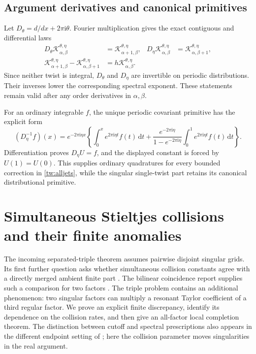 \documentclass[11pt,a4paper]{article}
\numberwithin{equation}{section}
\theoremstyle{definition}
\theoremstyle{remark}
\newcommand{\ii}{\mathrm i}
\newcommand{\dd}{\,\mathrm d}
\begin{document}
\subsection{Argument derivatives and canonical primitives}

Let $D_\theta=d/dx+2\pi\ii\theta$. Fourier multiplication gives
the exact contiguous and differential laws
\begin{align}
 D_\theta\mathcal K_{\alpha,\beta}^{\theta,\eta}
   &=\mathcal K_{\alpha+1,\beta}^{\theta,\eta},&
 D_\eta\mathcal K_{\alpha,\beta}^{\theta,\eta}
   &=\mathcal K_{\alpha,\beta+1}^{\theta,\eta},\label{tw:diff}\\
 \mathcal K_{\alpha+1,\beta}^{\theta,\eta}
  -\mathcal K_{\alpha,\beta+1}^{\theta,\eta}
   &=h\mathcal K_{\alpha,\beta}^{\theta,\eta}.
 \label{tw:contiguous}
\end{align}
Since neither twist is integral, $D_\theta$ and $D_\eta$ are
invertible on periodic distributions. Their inverses lower the
corresponding spectral exponent. These statements remain valid after
any order derivatives in $\alpha,\beta$.

For an ordinary integrable $f$, the unique periodic covariant primitive
has the explicit form
\begin{equation}
 (D_\eta^{-1}f)(x)=e^{-2\pi\ii\eta x}
 \left\{\int_0^x e^{2\pi\ii\eta t}f(t)\dd t
   +\frac{e^{-2\pi\ii\eta}}{1-e^{-2\pi\ii\eta}}
          \int_0^1e^{2\pi\ii\eta t}f(t)\dd t\right\}.
 \label{tw:primitive}
\end{equation}
Differentiation proves $D_\eta U=f$, and the displayed constant is
forced by $U(1)=U(0)$. This supplies ordinary quadratures for every
bounded correction in \eqref{tw:alljets}, while the singular
single-twist part retains its canonical distributional primitive.


\clearpage
\section{Simultaneous Stieltjes collisions and their finite anomalies}
\label{cl:sec}

The incoming separated-triple theorem assumes pairwise disjoint singular
grids. Its first further question asks whether simultaneous collision
constants agree with a directly merged ambient finite part
\cite[Question~1]{RepoExact}. The bilinear coincidence report supplies
such a comparison for two factors \cite{RepoCoincident}. The triple
problem contains an additional phenomenon: two singular factors can
multiply a resonant Taylor coefficient of a third regular factor.
We prove an explicit finite discrepancy, identify its dependence on the
collision rates, and then give an all-factor local completion theorem.
The distinction between cutoff and spectral prescriptions also appears
in the different endpoint setting of \cite{RepoEndpoint}; here the
collision parameter moves singularities in the real argument.
\end{document}
